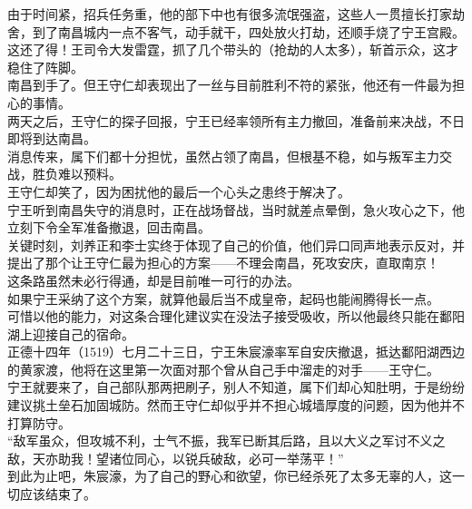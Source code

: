 \begin{multicols}{\theparacolNo}
由于时间紧，招兵任务重，他的部下中也有很多流氓强盗，这些人一贯擅长打家劫舍，到了南昌城内一点不客气，动手就干，四处放火打劫，还顺手烧了宁王宫殿。\\

这还了得！王司令大发雷霆，抓了几个带头的（抢劫的人太多），斩首示众，这才稳住了阵脚。\\

南昌到手了。但王守仁却表现出了一丝与目前胜利不符的紧张，他还有一件最为担心的事情。\\

两天之后，王守仁的探子回报，宁王已经率领所有主力撤回，准备前来决战，不日即将到达南昌。\\

消息传来，属下们都十分担忧，虽然占领了南昌，但根基不稳，如与叛军主力交战，胜负难以预料。\\

王守仁却笑了，因为困扰他的最后一个心头之患终于解决了。\\

宁王听到南昌失守的消息时，正在战场督战，当时就差点晕倒，急火攻心之下，他立刻下令全军准备撤退，回击南昌。\\

关键时刻，刘养正和李士实终于体现了自己的价值，他们异口同声地表示反对，并提出了那个让王守仁最为担心的方案——不理会南昌，死攻安庆，直取南京！\\

这条路虽然未必行得通，却是目前唯一可行的办法。\\

如果宁王采纳了这个方案，就算他最后当不成皇帝，起码也能闹腾得长一点。\\

可惜以他的能力，对这条合理化建议实在没法子接受吸收，所以他最终只能在鄱阳湖上迎接自己的宿命。\\

正德十四年（1519）七月二十三日，宁王朱宸濠率军自安庆撤退，抵达鄱阳湖西边的黄家渡，他将在这里第一次面对那个曾从自己手中溜走的对手——王守仁。\\

宁王就要来了，自己部队那两把刷子，别人不知道，属下们却心知肚明，于是纷纷建议挑土垒石加固城防。然而王守仁却似乎并不担心城墙厚度的问题，因为他并不打算防守。\\

“敌军虽众，但攻城不利，士气不振，我军已断其后路，且以大义之军讨不义之敌，天亦助我！望诸位同心，以锐兵破敌，必可一举荡平！”\\

到此为止吧，朱宸濠，为了自己的野心和欲望，你已经杀死了太多无辜的人，这一切应该结束了。\\


\end{multicols}
